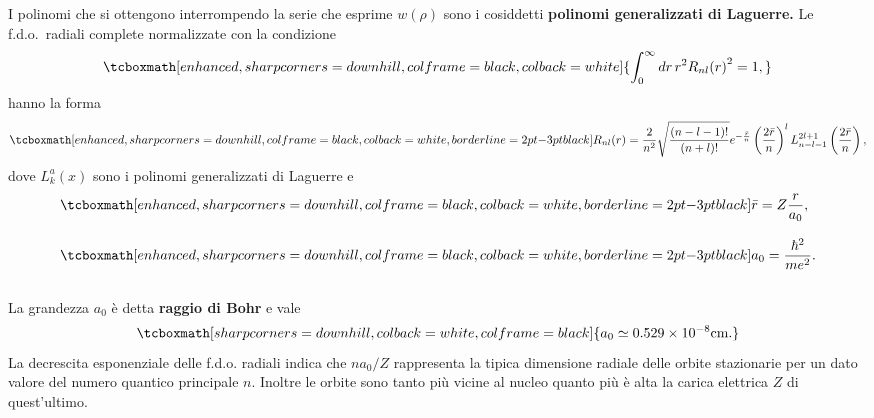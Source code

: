 I polinomi che si ottengono interrompendo la serie che esprime $w(\rho)$ sono i cosiddetti \textbf{polinomi generalizzati di Laguerre.} Le f.d.o.~radiali complete normalizzate con la condizione
	\begin{equation}
		\tcboxmath[enhanced, sharp corners=downhill, colframe=black, colback=white]{
			\int _0 ^{\infty} dr\, r^2 {R_{nl} (r)}^2=1,
			}
	\end{equation}
hanno la forma
	\begin{equation}
		\tcboxmath[enhanced, sharp corners=downhill, colframe=black, colback=white, borderline={2pt}{-3pt}{black}]{
			R_{nl}(r) =\frac{2}{n^2}\sqrt{\frac{\left(n-l-1\right) !}{\left(n+l\right) !}} e^{-\frac{\bar{r}}{n}}\left(\frac{2\bar{r}}{n}\right) ^l L_{n-l-1} ^{2l+1} \left(\frac{2\bar{r}}{n}\right) ,
			}
	\end{equation}
dove $L_k ^a (x)$ sono i polinomi generalizzati di Laguerre e
	\begin{align}
		&\tcboxmath[enhanced, sharp corners=downhill, colframe=black, colback=white, borderline={2pt}{-3pt}{black}]{
			\bar{r}= Z\frac{r}{a_0},
			} \\[0.3cm]
		&\tcboxmath[enhanced, sharp corners=downhill, colframe=black, colback=white, borderline={2pt}{-3pt}{black}]{
			a_0= \frac{\hbar ^2}{me^2}.
			}
	\end{align}\\
	
La grandezza $a_0$ è detta \textbf{raggio di Bohr} e vale
	\begin{equation}
		\tcboxmath[sharp corners=downhill, colback=white, colframe=black]{
			a_0 \simeq 0.529 \times 10^{-8} \textrm{cm}.
			}
	\end{equation}
La decrescita esponenziale delle f.d.o. radiali indica che $n a_0/Z$ rappresenta la tipica dimensione radiale delle orbite stazionarie per un dato valore del numero quantico principale $n$. Inoltre le orbite sono tanto più vicine al nucleo quanto più è alta la carica elettrica $Z$ di quest'ultimo.\\

